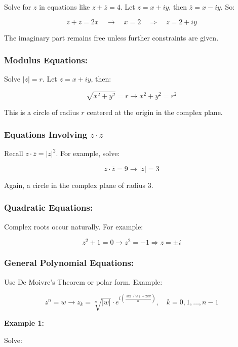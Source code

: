 Solve for \( z \) in equations like \( z + \overline{z} = 4 \).
Let \( z = x + iy \), then \( \overline{z} = x - iy \). So:
	      
\[
	z + \overline{z} = 2x \quad \to \quad x = 2 \quad \Rightarrow \quad z = 2 + iy
\]
	      
The imaginary part remains free unless further constraints are given.

\subsubsection{Modulus Equations:}

Solve \( |z| = r \). Let \( z = x + iy \), then:
	      
\[
	\sqrt{x^2 + y^2} = r \to x^2 + y^2 = r^2
\]

This is a circle of radius \( r \) centered at the origin in the complex plane.

\subsubsection{Equations Involving \texorpdfstring{\( z \cdot \overline{z} \)}{}}

Recall \( z \cdot \overline{z} = |z|^2 \). For example, solve:
	      
\[
	z \cdot \overline{z} = 9 \to |z| = 3
\]

Again, a circle in the complex plane of radius 3.

\subsubsection{Quadratic Equations:}

Complex roots occur naturally. For example:

\[
	z^2 + 1 = 0 \to z^2 = -1 \Rightarrow z = \pm i
\]

\subsubsection{General Polynomial Equations:}

 Use De Moivre’s Theorem or polar form. Example:
	      
\[
	z^n = w \to z_k = \sqrt[n]{|w|} \cdot e^{i\left( \frac{\arg(w) + 2k\pi}{n} \right)}, \quad k = 0, 1, \dots, n-1
\]

\textbf{Example 1:}
\vspace{\baselineskip}

Solve:

